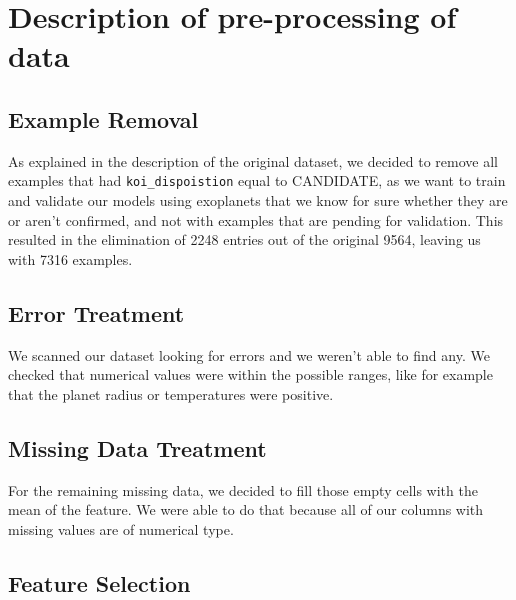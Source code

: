 
\section{Description of pre-processing of data}%
\label{sec:desc-prep}


\subsection{Example Removal}

As explained in the description of the original dataset, we decided to remove all examples
that had \texttt{koi\_dispoistion} equal to CANDIDATE, as we want to train and validate our
models using exoplanets that we know for sure whether they are or aren't confirmed, and not
with examples that are pending for validation. This resulted in the elimination of 2248 entries
out of the original 9564, leaving us with 7316 examples.

\subsection{Error Treatment}

We scanned our dataset looking for errors and we weren't able to find any. We checked
that numerical values were within the possible ranges, like for example that the
planet radius or temperatures were positive.

\subsection{Missing Data Treatment}

For the remaining missing data, we decided to fill those empty cells with the mean
of the feature. We were able to do that because all of our columns with missing values
are of numerical type.

\subsection{Feature Selection}%
\label{sub:feature_removal}

